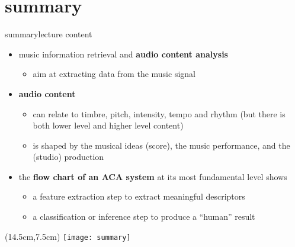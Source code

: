     \section{summary}
        \begin{frame}{summary}{lecture content}
            \begin{itemize}
                \item   music information retrieval and \textbf{audio content analysis} 
                    \begin{itemize}
                        \item   aim at extracting data from the music signal
                    \end{itemize}
                \bigskip
                \item      \textbf{audio content}
                    \begin{itemize}
                        \item   can relate to timbre, pitch, intensity, tempo and rhythm (but there is both lower level and higher level content)
                        \item   is shaped by the musical ideas (score), the music performance, and the (studio) production
                    \end{itemize}
                \bigskip
                \item   the \textbf{flow chart of an ACA system} at its most fundamental level shows
                    \begin{itemize}
                        \item   a feature extraction step to extract meaningful descriptors
                        \item   a classification or inference step to produce a ``human'' result
                    \end{itemize}
            \end{itemize}
            \begin{textblock*}{100mm}(14.5cm,7.5cm)
                \texttt{[image: summary]}
            \end{textblock*}
        \end{frame}


